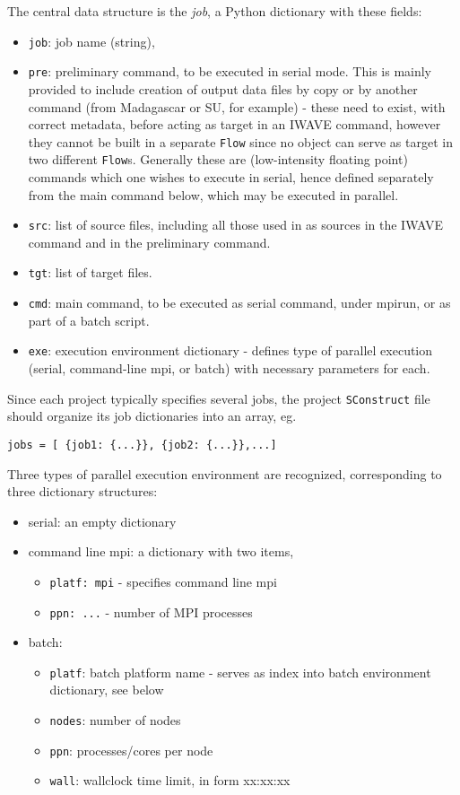 The central data structure is the {\em job}, a Python dictionary with these fields:
\begin{itemize}
\item {\tt job}: job name (string),
\item {\tt pre}: preliminary command, to be executed in serial mode. This is mainly provided to include creation of output data files by copy or by another command (from Madagascar or SU, for example) - these need to exist, with correct metadata, before acting as target in an IWAVE command, however they cannot be built in a separate {\tt Flow} since no object can serve as target in two different {\tt Flow}s. Generally these are (low-intensity floating point) commands which one wishes to execute in serial, hence defined separately from the main command below, which may be executed in parallel.
\item {\tt src}: list of source files, including all those used in as sources in the IWAVE command and in the preliminary command. 
\item {\tt tgt}: list of target files.
\item {\tt cmd}: main command, to be executed as serial command, under mpirun, or as part of a batch script.
\item {\tt exe}: execution environment dictionary - defines type of parallel execution (serial, command-line mpi, or batch) with necessary parameters for each.
\end{itemize}
Since each project typically specifies several jobs, the project {\tt SConstruct} file should organize its job dictionaries into an array, eg.
\begin{verbatim}
jobs = [ {job1: {...}}, {job2: {...}},...]
\end{verbatim}

Three types of parallel execution environment are recognized, corresponding to three dictionary structures:
\begin{itemize}
\item serial: an empty dictionary
\item command line mpi: a dictionary with two items,
\begin{itemize}
\item {\tt platf: mpi} - specifies command line mpi
\item {\tt ppn: ...} - number of MPI processes
\end{itemize}
\item batch:
\begin{itemize}
\item {\tt platf}: batch platform name - serves as index into batch environment dictionary, see below
\item {\tt nodes}: number of nodes
\item {\tt ppn}: processes/cores per node
\item {\tt wall}: wallclock time limit, in form xx:xx:xx
\end{itemize}
\end{itemize}


